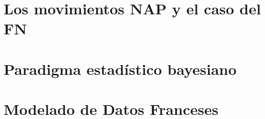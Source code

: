 \documentclass[oneside,10pt,review,usenames,dvipsnames]{book}
\theoremstyle{definition}
\begin{document}

\frontmatter






\newpage




\tableofcontents




\mainmatter 

\pagestyle{fancy}
	\fancyhf{}
	\rhead{\thepage}
	\fancyhead[L]{\nouppercase{\leftmark}}

\part{Los movimientos NAP y el caso del FN} 
	
	
	
	

\part{Paradigma estadístico bayesiano}

	
	
	

\part{Modelado de Datos Franceses}
	
	
	
	


\appendix
\end{document}
